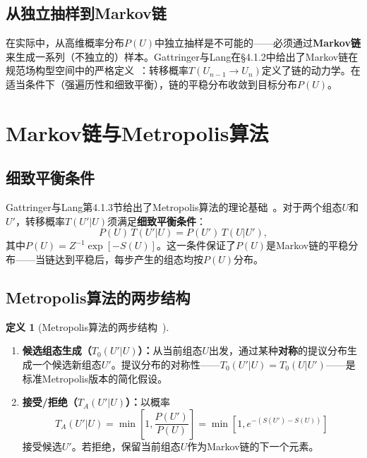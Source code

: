 \documentclass[12pt,a4paper]{ctexart}
\theoremstyle{definition}
\newtheorem{definition}{定义}[section]
\begin{document}
\subsection{从独立抽样到Markov链}

在实际中，从高维概率分布$P(U)$中独立抽样是不可能的——必须通过\textbf{Markov链}来生成一系列（不独立的）样本。Gattringer与Lang在§4.1.2中给出了Markov链在规范场构型空间中的严格定义~\cite{GattringerLang2010}：转移概率$T(U_{n-1} \to U_n)$定义了链的动力学。在适当条件下（强遍历性和细致平衡），链的平稳分布收敛到目标分布$P(U)$。

\section{Markov链与Metropolis算法}

\subsection{细致平衡条件}

Gattringer与Lang第4.1.3节给出了Metropolis算法的理论基础~\cite{GattringerLang2010}。对于两个组态$U$和$U'$，转移概率$T(U'|U)$须满足\textbf{细致平衡条件}：
\begin{equation}
\boxed{P(U) \, T(U'|U) = P(U') \, T(U|U')},
\label{eq:detailed_balance}
\end{equation}
其中$P(U) = Z^{-1} \exp[-S(U)]$。这一条件保证了$P(U)$是Markov链的平稳分布——当链达到平稳后，每步产生的组态均按$P(U)$分布。

\subsection{Metropolis算法的两步结构}

\begin{definition}[Metropolis算法的两步结构~\cite{GattringerLang2010}]
\begin{enumerate}[leftmargin=*]
    \item \textbf{候选组态生成（$T_0(U'|U)$）：}从当前组态$U$出发，通过某种\textbf{对称}的提议分布生成一个候选新组态$U'$。提议分布的对称性——$T_0(U'|U) = T_0(U|U')$——是标准Metropolis版本的简化假设。
    \item \textbf{接受/拒绝（$T_A(U'|U)$）：}以概率
    \begin{equation}
    \boxed{T_A(U'|U) = \min\!\left[1, \frac{P(U')}{P(U)}\right] = \min\!\left[1, e^{-(S(U')-S(U))}\right]}
    \label{eq:metropolis_accept}
    \end{equation}
    接受候选$U'$。若拒绝，保留当前组态$U$作为Markov链的下一个元素。
\end{enumerate}
\end{definition}
\end{document}
